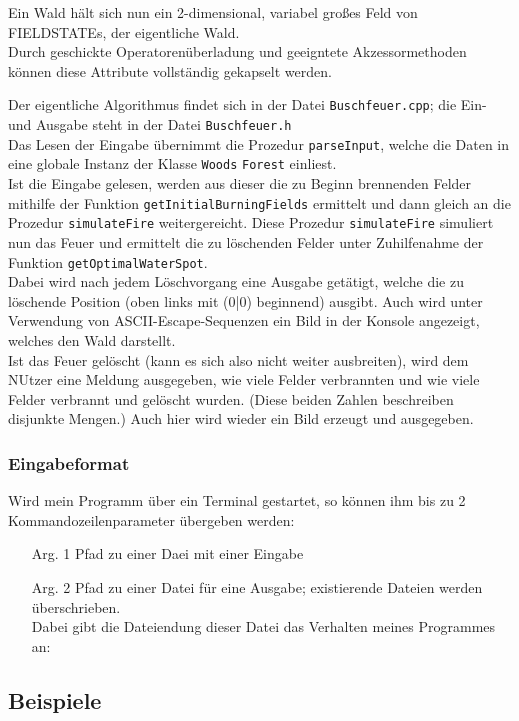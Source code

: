Ein Wald hält sich nun ein 2-dimensional, variabel großes Feld von FIELDSTATEs, der eigentliche Wald.\\
Durch geschickte Operatorenüberladung und geeigntete Akzessormethoden können diese Attribute vollständig gekapselt werden.

Der eigentliche Algorithmus findet sich in der Datei \texttt{Buschfeuer.cpp}; die Ein- und Ausgabe steht in der Datei \texttt{Buschfeuer.h}\\
Das Lesen der Eingabe übernimmt die Prozedur \texttt{parseInput}, welche die Daten in eine globale Instanz der Klasse \texttt{Woods} \texttt{Forest} einliest.\\
Ist die Eingabe gelesen, werden aus dieser die zu Beginn brennenden Felder mithilfe der Funktion \texttt{getInitialBurningFields} ermittelt und dann gleich an die Prozedur \texttt{simulateFire} weitergereicht. Diese Prozedur \texttt{simulateFire} simuliert nun das Feuer und ermittelt die zu löschenden Felder unter Zuhilfenahme der Funktion \texttt{getOptimalWaterSpot}.\\
Dabei wird nach jedem Löschvorgang eine Ausgabe getätigt, welche die zu löschende Position (oben links mit (0|0) beginnend) ausgibt. Auch wird unter Verwendung von ASCII-Escape-Sequenzen ein Bild in der Konsole angezeigt, welches den Wald darstellt.\\
Ist das Feuer gelöscht (kann es sich also nicht weiter ausbreiten), wird dem NUtzer eine Meldung ausgegeben, wie viele Felder verbrannten und wie viele Felder verbrannt und gelöscht wurden. (Diese beiden Zahlen beschreiben disjunkte Mengen.) Auch hier wird wieder ein Bild erzeugt und ausgegeben.

\subsubsection{Eingabeformat}
Wird mein Programm über ein Terminal gestartet, so können ihm bis zu 2 Kommandozeilenparameter übergeben werden:
\begin{itemize}
\item[Arg. 1] Pfad zu einer Daei mit einer Eingabe
\item[Arg. 2] Pfad zu einer Datei für eine Ausgabe; existierende Dateien werden überschrieben.\\
Dabei gibt die Dateiendung dieser Datei das Verhalten meines Programmes an:
\end{itemize}
\newpage
\subsection{Beispiele}
